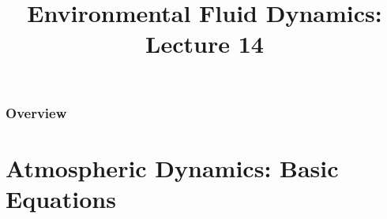 
\title{Environmental Fluid Dynamics: Lecture 14}
\newcommand{\ihat}{\boldsymbol{\hat{\imath}}}
\newcommand{\jhat}{\boldsymbol{\hat{\jmath}}}
\newcommand{\khat}{\boldsymbol{\hat{k}}}
\newcommand{\fontsizeone}{1.9em}
\usepackage{esvect}
\newcommand{\framecard}[2][colorgreen]{
  {\setbeamercolor{background canvas}{bg=#1}
    \begin{frame}[plain]
    \vfill
    \begin{center}
     {#2}
    \end{center}
    \vfill
    \end{frame}
  }
}



\begin{frame} 
  \titlepage
\end{frame}


\begin{frame}
\frametitle{Overview}
\tableofcontents
\end{frame}

\section{Atmospheric Dynamics: Basic Equations} %
